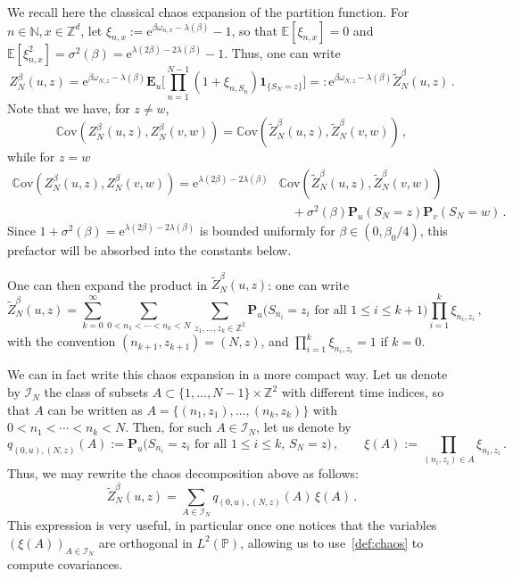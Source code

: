 \documentclass[11pt]{amsart}
\numberwithin{equation}{section}
\newcommand*{\EE}{\mathbb{E}}
\newcommand*{\PP}{\mathbb{P}}
\newcommand*{\bE}{\mathbf{E}}
\newcommand*{\bP}{\mathbf{P}}
\newcommand*{\ind}{\mathbf{1}}
\newcommand*{\numberset}{\mathbb}
\newcommand*{\N}{\numberset{N}}
\newcommand*{\Z}{\numberset{Z}}
\newcommand{\e}{\mathrm{e}}
\newcommand*{\Cov}{\mathbb{C}\mathrm{ov}}
\theoremstyle{plain}
\theoremstyle{definition}
\theoremstyle{remark}
\begin{document}
We recall here the classical chaos expansion of the partition function.
For \(n\in \N,x\in \Z^d\), let \(\xi_{n,x} := \e^{\beta \omega_{n,x}-\lambda(\beta)}-1\), so that \(\EE[\xi_{n,x}]=0\) and \(\EE[\xi_{n,x}^2] = \sigma^2(\beta) = \e^{\lambda(2\beta)-2\lambda(\beta)}-1\). Thus, one can write 
\[
Z_N^{\beta}(u,z) = \e^{\beta \omega_{N,z} -\lambda(\beta)} \bE_u\Big[ \prod_{n=1}^{N-1}  (1+\xi_{n,S_n}) \ind_{\{S_{N}=z\}} \Big]  =: \e^{\beta \omega_{N,z} -\lambda(\beta)} \tilde Z_N^{\beta}(u,z)\,.
\]
Note that we have, for \(z\neq w\),
\begin{equation}
       \label{eq:Z-tilde-Z}
       \Cov(Z_N^{\beta}(u,z), Z_N^{\beta}(v,w)) =  \Cov(\tilde Z_N^{\beta}(u,z), \tilde Z_N^{\beta}(v,w))\,,
\end{equation}
while for \(z=w\)
\begin{equation}
       \label{eq:Z-tilde-Z-2}
       \begin{split}
            \Cov(Z_N^{\beta}(u,z), Z_N^{\beta}(v,w))  =  \e^{\lambda(2\beta) -2\lambda(\beta)} &\Cov(\tilde Z_N^{\beta}(u,z), \tilde Z_N^{\beta}(v,w)) \\
            & \quad + \sigma^2(\beta) \bP_u(S_N=z) \bP_v(S_N=w)\,.  
       \end{split}
\end{equation}
Since \(1+\sigma^2(\beta)=\e^{\lambda(2\beta)-2\lambda(\beta)}\) is bounded uniformly for \(\beta\in(0,\beta_0/4)\), this prefactor will be absorbed into the constants below.






One can then expand the product in \(\tilde Z_N^{\beta}(u,z)\): one can write 
\[
\tilde Z_N^{\beta}(u,z) = \sum_{k=0}^{\infty}  \sum_{0 < n_1< \cdots < n_{k}< N } \sum_{z_1,\ldots, z_{k}\in \Z^2} \bP_u \big( S_{n_i}=z_i \text{ for all } 1\leq i\leq k+1 \big)\prod_{i=1}^k \xi_{n_i,z_i} \,,
\]
with the convention \((n_{k+1},z_{k+1}) = (N,z)\), and \(\prod_{i=1}^k \xi_{n_i,z_i} =1\) if \(k=0\).


We can in fact write this chaos expansion in a more compact way.
Let us denote by \(\mathcal{I}_{N}\) the class of subsets \(A \subset \{1,\ldots, N-1\} \times \Z^2\) with different time indices, so that \(A\) can be written as \(A =\{(n_1,z_1), \ldots, (n_k,z_k)\}\) with \(0<n_1<\cdots <n_k < N\). 
Then, for such \(A \in \mathcal{I}_{N}\), let us denote by 
\[
q_{(0,u),(N,z)}(A) := \bP_u\big( S_{n_i}=z_i \text{ for all } 1\leq i\leq k, \, S_N=z \big)\,, \qquad \xi(A) := \prod_{(n_i,z_i)\in A} \xi_{n_i,z_i}\,.
\]
Thus, we may rewrite the chaos decomposition above as follows:
\begin{equation}
       \label{def:chaos}
       \tilde Z_N^{\beta}(u,z) = \sum_{A \in  \mathcal{I}_{N}} q_{(0,u),(N,z)}(A) \, \xi(A) \,.  
\end{equation}
This expression is very useful, in particular once one notices that the variables \((\xi(A))_{A\in \mathcal{I}_{N}}\) are orthogonal in \(L^2(\PP)\), allowing us to use~\eqref{def:chaos} to compute covariances.
\end{document}
